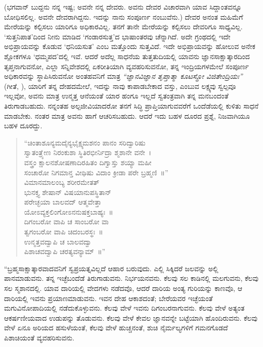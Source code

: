 (ಭಗವಾನ್ ಬುದ್ದನು ನನ್ನ ಇಷ್ಟ; ಅವನೇ ನನ್ನ ದೇವರು. ಅವನು ದೇವರ ವಿಚಾರವಾಗಿ ಯಾವ ಸಿದ್ದಾಂತವನ್ನೂ ಬೋಧಿಸಲಿಲ್ಲ. ಅವನೇ ದೇವರಾಗಿದ್ದನು. ಇದನ್ನು ನಾನು ಸಂಪೂರ್ಣ ನಂಬುವೆನು.) ದೇವರ ಅನಂತ ಮಹಿಮೆಗೆ ಮೇರೆಯನ್ನು ಕಲ್ಪಿಸಲು ಯಾರಿಗೂ ಅಧಿಕಾರವಿಲ್ಲ. ತನಗೆ ತಾನೇ ಮೇರೆಯನ್ನು ಕಲ್ಪಿಸಲು ದೇವರಿಗೂ ಸಾಧ್ಯವಿಲ್ಲ. `ಸುತ್ತನಿಪಾತ'ದಿಂದ ನೀನು ಮಾಡಿದ `ಗಂಡಾರಸುತ್ತ'ದ ಭಾಷಾಂತರವು ಚೆನ್ನಾಗಿದೆ. ಅದೇ ಗ್ರಂಥದಲ್ಲಿ ಇದೇ ಅಭಿಪ್ರಾಯವನ್ನು ಕೊಡುವ `ಧನಿಯಸುತ' ಎಂಬ ಮತ್ತೊಂದು ಸುತ್ತವಿದೆ. ಇದೇ ಅಭಿಪ್ರಾಯವನ್ನು ಹೋಲುವ ಅನೇಕ ಶ್ಲೋಕಗಳೂ `ಧಮ್ಮಪದ'ದಲ್ಲಿ ಇವೆ. ಆದರೆ ಅದೆಲ್ಲ ಸಾಧನೆಯ ತುತ್ತತುದಿಯಲ್ಲಿ ಯಾವನು ಜ್ಞಾನಸಾಕ್ಷಾತ್ಕಾರದಿಂದ ತೃಪ್ತನಾಗುವನೋ, ಎಲ್ಲಾ ಸನ್ನಿವೇಶದಲ್ಲಿ ಏಕರೀತಿಯಾಗಿ ವ್ಯವಹರಿಸುವನೋ, ತನ್ನ ಇಂದ್ರಿಯಗಳಮೇಲೆ ಸಂಪೂರ್ಣ ಅಧಿಕಾರವನ್ನು ಸ್ಥಾಪಿಸಿರುವನೋ ಅಂತಹವನಿಗೆ ಮಾತ್ರ\enginline{-} \textit{ “ಜ್ಞಾನವಿಜ್ಞಾನ ತೃಪ್ತಾತ್ಮಾ ಕೂಟಸ್ಥೋ ವಿಜಿತೇಂದ್ರಿಯಃ” } (ಗೀತೆ, ), ಯಾರಿಗೆ ತನ್ನ ದೇಹದಮೇಲೆ, ಇದನ್ನು ನಾವು ಕಾಪಾಡಬೇಕಾದ ವಸ್ತು, ಎಂಬುವ ಲಕ್ಷ್ಯವು ಸ್ವಲ್ಪವೂ ಇಲ್ಲವೋ, ಅವನು ಮಾತ್ರ ಉನ್ಮತ್ತ ಆನೆಯಂತೆ ಯಾರ ಹಂಗೂ ಇಲ್ಲದೆ ಸ್ವತಂತ್ರವಾಗಿ ತನ್ನ ಮನಬಂದಂತೆ ತಿರುಗಾಡಬಹುದು. ನನ್ನಂತಹ ಅಲ್ಪಜೀವಿಯಾದರೋ ತನಗೆ ಸಿದ್ಧಿ ಪ್ರಾಪ್ತಿಯಾಗುವವರೆಗೆ ಒಂದೆಡೆಯಲ್ಲಿ ಕುಳಿತು ಸಾಧನೆ ಮಾಡಬೇಕು. ನಂತರ ಮಾತ್ರ ಅವನು ಹಾಗೆ ಆಚರಿಸಬಹುದು. ಆದರೆ ಇದು ಬಹಳ ದೂರದ ಪ್ರಶ್ನೆ, ನಿಜವಾಗಿಯೂ ಬಹಳ ದೂರದ್ದು.

\begin{verse}
 “ಚಿಂತಾಶೂನ್ಯಮದೈನ್ಯಭೈಕ್ಷ್ಯಮಶನಂ ಪಾನಂ ಸರಿದ್ವಾರಿಷು\\
 ಸ್ವಾತಂತ್ರ್ಯೇಣ ನಿರಂಕುಶಾ ಸ್ಥಿತಿರಭೀರ್ನಿದ್ರಾ ಶ್ಮಶಾನೇ ವನೇ~।\\
 ವಸ್ತ್ರಂ ಕ್ಷಾಲನಶೋಷಣಾದಿರಹಿತಂ ದಿಗ್ವಾಸ್ತು ಶಯ್ಯಾ ಮಹೀ\\
 ಸಂಚಾರೋ ನಿಗಮಾನ್ತ ವೀಥಿಷು ವಿದಾಂ ಕ್ರೀಡಾ ಪರೇ ಬ್ರಹ್ಮಣಿ~॥”\\
 ವಿಮಾನಮಾಲಂಬ್ಯ ಶರೀರಮೇತತ್\\
 ಭುನಕ್ತ್ಯ ಶೇಷಾನ್ ವಿಷಯಾನುಪಸ್ಥಿತಾನ್\\
 ಪರೇಚ್ಛಯಾ ಬಾಲವದ್ ಆತ್ಮವೇತ್ತಾ\\
 ಯೋಽವ್ಯಕ್ತಲಿಂಗೋಽನನುಷಕ್ತಬಾಹ್ಯಃ~॥\\
 ದಿಗಂಬರೋ ವಾಪಿ ಚ ಸಾಂಬರೋ ವಾ\\
 ತ್ವಗಂಬರೋ ವಾಪಿ ಚಿದಂಬರಸ್ಥಃ~॥\\
 ಉನ್ಮತ್ತವದ್ವಾಪಿ ಚ ಬಾಲವದ್ವಾ\\
 ಪಿಶಾಚವದ್ವಾಪಿ ಚರತ್ಯವನ್ಯಾಮ್~॥” 
\end{verse}


“ಬ್ರಹ್ಮಸಾಕ್ಷಾತ್ಕಾರವಾದವನಿಗೆ ಸ್ವಪ್ರಯತ್ನವಿಲ್ಲದೆ ಆಹಾರ ಬರುವುದು. ಎಲ್ಲಿ ಸಿಕ್ಕಿದರೆ ಜಲವನ್ನು ಅಲ್ಲಿ ಪಾನಮಾಡುವನು. ತನ್ನ ಇಚ್ಛೆಬಂದೆಡೆ ತಿರುಗಾಡುವನು. ನಿರ್ಭಯನವನು. ಕೆಲವು ಸಲ ಕಾಡಿನಲ್ಲಿ ಮಲಗುವನು, ಕೆಲವು ಸಲ ಸ್ಮಶಾನದಲ್ಲಿ. ಯಾವ ದಾರಿಯಲ್ಲಿ ವೇದಗಳು ನಡೆದವೊ, ಆದರೆ ದಾರಿಯ ಅಂತ್ಯ ಗುರಿಯನ್ನು ಕಾಣವೊ, ಆ ದಾರಿಯಲ್ಲಿ ಇವನು ಪ್ರಯಾಣಮಾಡುವನು. ಇವನ ದೇಹ ಆಕಾಶದಂತೆ; ಬೇರೆಯವರ ಇಚ್ಛೆಯಂತೆ ಮಗುವಿನೋಪಾದಿಯಲ್ಲಿ ನಡೆದುಕೊಳ್ಳುವನು. ಕೆಲವು ವೇಳೆ ಇವನು ದಿಗಂಬರನಾಗುವನು. ಕೆಲವು ವೇಳೆ ಅತ್ಯಂತ ಆಕರ್ಷಣೀಯವಾದ ಉಡುಪನ್ನು ತೊಡುವನು. ಕೆಲವು ವೇಳೆ ಕೇವಲ ಜ್ಞಾನವನ್ನೇ ಬಟ್ಟೆಯಾಗಿ ಹೊಂದಿರುವನು. ಕೆಲವು ವೇಳೆ ಏನೂ ಅರಿಯದ ಹಸುಳೆಯಂತೆ, ಕೆಲವು ವೇಳೆ ಹುಚ್ಚನಂತೆ, ಶುಚಿ ನೈರ್ಮಲ್ಯಗಳಿಗೆ ಗಮನಗೊಡದೆ ಪಿಶಾಚಿಯಂತೆ ವ್ಯವಹರಿಸುವನು.

